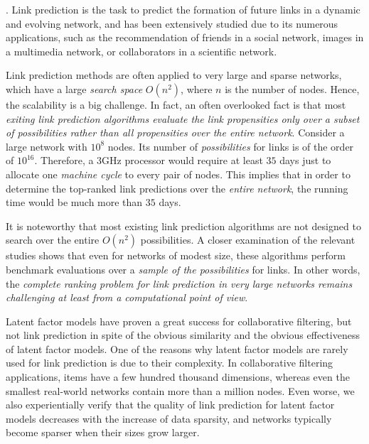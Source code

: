 . Link prediction is the task to predict the formation of future links in a dynamic and evolving network, and has been extensively studied due to its numerous applications, such as the recommendation of friends in a social network, images in a multimedia network, or collaborators in a scientific network.


Link prediction methods are often applied to very large and sparse networks, which have a large {\em search space} $O(n^2)$,
where $n$ is the number of nodes. Hence, the scalability is a big challenge. In fact, an often overlooked fact is that most {\em exiting link prediction algorithms evaluate the link propensities only over a subset of possibilities rather than all propensities over the entire network}. %
Consider a large network with $10^8$ nodes. Its number of {\em possibilities} for links
is of the order of $10^{16}$. Therefore, a 3GHz processor would
require at least $35$ days just to allocate one {\em machine cycle} to
every pair of nodes. This implies that in order to determine the
top-ranked link predictions over the {\em entire network}, the
running time would be much more than $35$ days.

It is noteworthy that most existing link prediction algorithms are not designed to search over the entire
$O(n^2)$ possibilities. A closer examination of the relevant
studies shows that even for networks of modest size, these
algorithms perform benchmark evaluations over a {\em
sample of the possibilities} for links.  In other
words, the {\em complete ranking problem for link prediction in
very large networks remains challenging at least from a
computational point of view}.


Latent factor models have proven a great success for
collaborative filtering, but not link prediction in spite of the obvious
similarity and
the obvious effectiveness of latent factor models. One of the reasons why latent factor models are rarely used for
link prediction is due to their complexity. In
collaborative filtering applications, items have a few hundred thousand dimensions, whereas even the smallest  real-world networks contain more than a million nodes.
Even worse, we also experientially verify that the quality of link prediction for latent factor models decreases with the increase of data sparsity,
and networks typically become sparser when their sizes grow larger.





